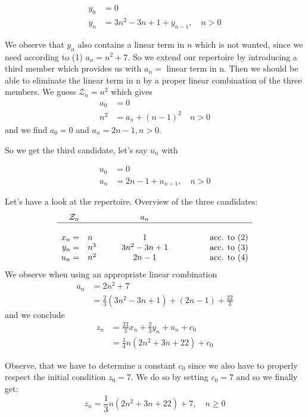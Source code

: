\begin{align*}
y_0&=0\\
y_n&=3n^2-3n+1+y_{n-1},\quad n>0\tag{3}
\end{align*}

We observe that $y_n$ also contains a linear term in $n$ which is not wanted, since we need according to (1) $a_n=n^2+7$. So we extend our repertoire by introducing a third member which provides us with $a_n=$ linear term in n. Then we should be able to eliminate the linear term in n by a proper linear combination of the three members. We guess $\mathcal{Z}_n=n^2$ which gives
\begin{align*}
a_0&=0\\
n^2&=a_n+(n-1)^2\quad n>0
\end{align*}
and we find $a_0=0$ and $a_n=2n-1,n>0$.

So we get the third candidate, let's say $u_n$ with

\begin{align*}
u_0&=0\\
u_n&=2n-1+u_{n-1},\quad n>0\tag{4}
\end{align*}

Let's have a look at the repertoire. Overview of the three candidates:
$$
\begin{array}{rlcr}
\mathcal{Z}_n&&a_n&\\
\hline\\
x_n=&n\qquad&1&\qquad\qquad\text{acc. to }(2)\\
y_n=&n^3\qquad&3n^2-3n+1&\qquad\qquad\text{acc. to }(3)\\
u_n=&n^2\qquad&2n-1&\qquad\qquad\text{acc. to }(4)\\
\end{array}
$$
We observe when using an appropriate linear combination
\begin{align*}
a_n&=2n^2+7\\
&=\frac{2}{3}\left(3n^2-3n+1\right)+\left(2n-1\right)+\frac{22}{3}
\end{align*}
and we conclude
\begin{align*}
z_n&=\frac{22}{3}x_n+\frac{2}{3}y_n+u_n+c_0\\
&=\frac{1}{3}n\left(2n^2+3n+22\right)+c_0
\end{align*}

Observe, that we have to determine a constant $c_0$ since we also have to properly respect the initial condition $z_0=7$. We do so by setting $c_0=7$ and so we finally get:
$$z_n=\frac{1}{3}n\left(2n^2+3n+22\right)+7,\quad n\geq 0$$
